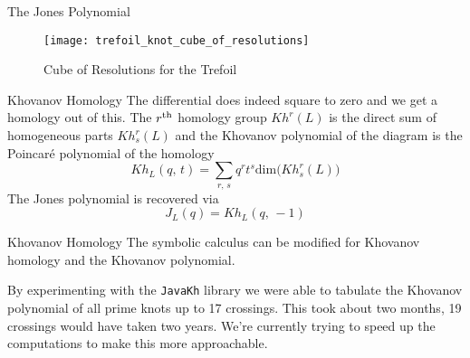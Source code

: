 \documentclass{beamer}
\begin{document}
    \begin{frame}{The Jones Polynomial}
        \begin{figure}
            \centering
            \texttt{[image: trefoil\_knot\_cube\_of\_resolutions]}
            \caption{Cube of Resolutions for the Trefoil}
        \end{figure}
    \end{frame}
    \begin{frame}{Khovanov Homology}
        The differential does indeed square to zero and we get a homology
        out of this. The $r^{\small\textrm{th}}$ homology group
        $Kh^{r}(L)$ is the direct sum of homogeneous parts
        $Kh^{r}_{s}(L)$ and the Khovanov polynomial of the diagram is the
        Poincar\'{e} polynomial of the homology
        \begin{equation}
            Kh_{L}(q,\,t)=
            \sum_{r,\,s}q^{r}t^{s}\textrm{dim}\big(Kh_{s}^{r}(L)\big)
        \end{equation}
        The Jones polynomial is recovered via
        \begin{equation}
            J_{L}(q)=Kh_{L}(q,\,-1)
        \end{equation}
    \end{frame}
    \begin{frame}{Khovanov Homology}
        The symbolic calculus can be modified for Khovanov homology and the
        Khovanov polynomial.
        \par\hfill\par
        By experimenting with the \texttt{JavaKh} library we were able to
        tabulate the Khovanov polynomial of all prime knots up to 17 crossings.
        This took about two months, 19 crossings would have taken two years.
        We're currently trying to speed up the computations to make this more
        approachable.
    \end{frame}
\end{document}
